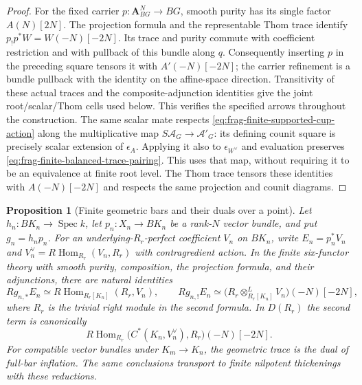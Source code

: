 \documentclass[11pt]{article}
\newtheorem{proposition}[theorem]{Proposition}
\theoremstyle{definition}
\theoremstyle{remark}
\newcommand{\Spec}{\operatorname{Spec}}
\begin{document}
\begin{proof}
For the fixed carrier $p:\mathbf A^N_{BG}\to BG$, smooth purity
has its single factor $A(N)[2N]$.  The projection formula and the
representable Thom trace identify
$p_!p^*W=W(-N)[-2N]$.  Its trace and purity commute with coefficient
restriction and with pullback of this bundle along $q$.
Consequently inserting $p$ in the preceding square tensors it
with $A'(-N)[-2N]$; the carrier refinement is a bundle pullback
with the identity on the affine-space direction.  Transitivity of
these actual traces and the composite-adjunction identities give
the joint root/scalar/Thom cells used below.  This verifies the
specified arrows throughout the construction.
The same scalar mate respects \eqref{eq:frag-finite-supported-cup-action}
along the multiplicative map $S\mathcal A_G\to\mathcal A'_G$:
its defining counit square is precisely scalar extension of
$\epsilon_A$.  Applying it also to $\epsilon_{W^\vee}$ and evaluation
preserves \eqref{eq:frag-finite-balanced-trace-pairing}.
This uses that map, without requiring it to be an equivalence at
finite root level.  The Thom trace tensors these identities with
$A(-N)[-2N]$ and respects the same projection and counit diagrams.
\end{proof}

\begin{proposition}[Finite geometric bars and their duals over a point]
\label{prop:frag-point-geometric-bars}
Let $h_n:BK_n\to\Spec k$, let $p_n:X_n\to BK_n$ be a rank-$N$ vector
bundle, and put $g_n=h_np_n$.  For an underlying-$R_r$-perfect coefficient
$V_n$ on $BK_n$, write $E_n=p_n^*V_n$ and
$V_n^\vee=R\operatorname{Hom}_{R_r}(V_n,R_r)$ with contragredient action.
In the finite six-functor theory with smooth purity, composition, the
projection formula, and their adjunctions, there are natural identities
\[
 Rg_{n,*}E_n\simeq R\operatorname{Hom}_{R_r[K_n]}(R_r,V_n),
 \qquad
 Rg_{n,!}E_n\simeq
 \bigl(R_r\otimes^L_{R_r[K_n]}V_n\bigr)(-N)[-2N],
\]
where $R_r$ is the trivial right module in the second formula.  In
$D(R_r)$ the second term is canonically
\[
 R\operatorname{Hom}_{R_r}
 \bigl(C^*(K_n,V_n^\vee),R_r\bigr)(-N)[-2N].
\]
For compatible vector bundles under $K_m\to K_n$, the geometric trace
is the dual of full-bar inflation.  The same conclusions transport to
finite nilpotent thickenings with these reductions.
\end{proposition}
\end{document}
